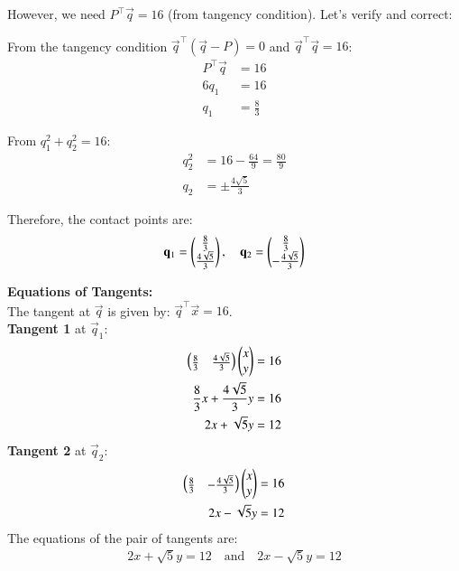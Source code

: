 \documentclass[article]{IEEEtran}
\begin{document}
	However, we need $P^\top\vec{q} = 16$ (from tangency condition). Let's verify and correct:
	
	From the tangency condition $\vec{q}^\top(\vec{q} - P) = 0$ and $\vec{q}^\top\vec{q} = 16$:
	\begin{align}
		P^\top\vec{q} &= 16\\
		6q_1 &= 16\\
		q_1 &= \frac{8}{3}
	\end{align}
	
	From $q_1^2 + q_2^2 = 16$:
	\begin{align}
		q_2^2 &= 16 - \frac{64}{9} = \frac{80}{9}\\
		q_2 &= \pm\frac{4\sqrt{5}}{3}
	\end{align}
	
	Therefore, the contact points are:
	\begin{align}
		\mathbf{q}_1 = \begin{pmatrix}\frac{8}{3}\\\frac{4\sqrt{5}}{3}\end{pmatrix}, \quad \mathbf{q}_2 = \begin{pmatrix}\frac{8}{3}\\-\frac{4\sqrt{5}}{3}\end{pmatrix}
	\end{align}
	
	\textbf{Equations of Tangents:}\\
	The tangent at $\vec{q}$ is given by: $\vec{q}^\top\vec{x} = 16$.\\
	\textbf{Tangent 1} at $\vec{q}_1$:
	\begin{align}
		\begin{pmatrix}\frac{8}{3} & \frac{4\sqrt{5}}{3}\end{pmatrix}\begin{pmatrix}x\\y\end{pmatrix} &= 16\\
		\frac{8}{3}x + \frac{4\sqrt{5}}{3}y &= 16\\
		2x + \sqrt{5}y &= 12
	\end{align}	
	\textbf{Tangent 2} at $\vec{q}_2$:
	\begin{align}
		\begin{pmatrix}\frac{8}{3} & -\frac{4\sqrt{5}}{3}\end{pmatrix}\begin{pmatrix}x\\y\end{pmatrix} &= 16\\
		2x - \sqrt{5}y &= 12
	\end{align}
	The equations of the pair of tangents are:
	\begin{align}
		\boxed{2x + \sqrt{5}y = 12 \quad \text{and} \quad 2x - \sqrt{5}y = 12}
	\end{align}
	
\end{document}
